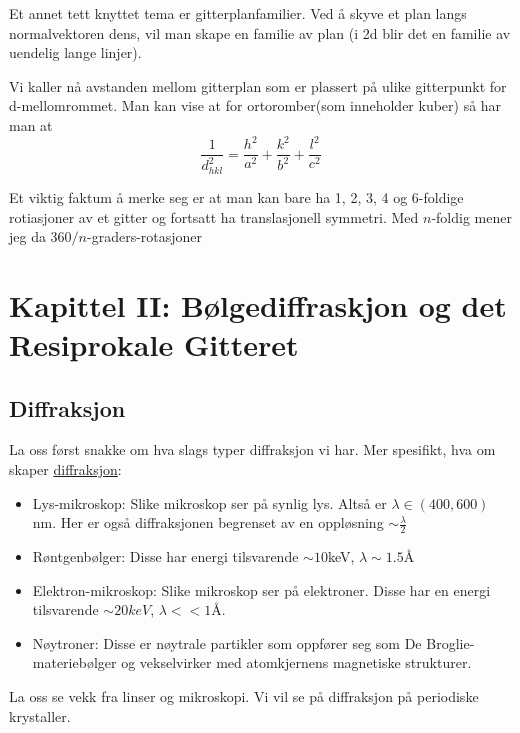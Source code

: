 \documentclass{article}
\begin{document}
Et annet tett knyttet tema er gitterplanfamilier. Ved å skyve et plan langs normalvektoren dens, vil man skape en familie av plan (i 2d blir det en familie av uendelig lange linjer).

Vi kaller nå avstanden mellom gitterplan som er plassert på ulike gitterpunkt for d-mellomrommet. Man kan vise at for ortoromber(som inneholder kuber) så har man at
\begin{equation}
    \frac{1}{d^{2}_{hkl}} = \frac{h^2}{a^2} + \frac{k^2}{b^2} + \frac{l^2}{c^2}
\end{equation}

Et viktig faktum å merke seg er at man kan bare ha 1, 2, 3, 4 og 6-foldige rotiasjoner av et gitter og fortsatt ha translasjonell symmetri. Med $n$-foldig mener jeg da  $360 / n$-graders-rotasjoner
\newpage
\section{Kapittel II: Bølgediffraskjon og det Resiprokale Gitteret}
\subsection{Diffraksjon}
La oss først snakke om  hva slags typer diffraksjon vi har. Mer spesifikt, hva om skaper \underline{diffraksjon}:
\begin{itemize}
    \item Lys-mikroskop: Slike mikroskop ser på synlig lys. Altså er $\lambda \in (400, 600)$ nm. Her er også diffraksjonen begrenset av en oppløsning $\sim \frac{\lambda}{2}$
    \item Røntgenbølger: Disse har energi tilsvarende $\sim 10 $keV, $\lambda \sim 1.5$Å
    \item Elektron-mikroskop: Slike mikroskop ser på elektroner. Disse har en energi tilsvarende $\sim 20 keV$, $\lambda << 1$Å.
    \item Nøytroner: Disse er nøytrale partikler som oppfører seg som De Broglie-materiebølger og vekselvirker med atomkjernens magnetiske strukturer.
\end{itemize}
La oss se vekk fra linser og mikroskopi. Vi vil se på diffraksjon på periodiske krystaller.
\end{document}
